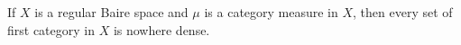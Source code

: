 If $X$ is a regular Baire space and $\mu$ is a category measure in $X$, then every set of first category in $X$ is nowhere dense.
